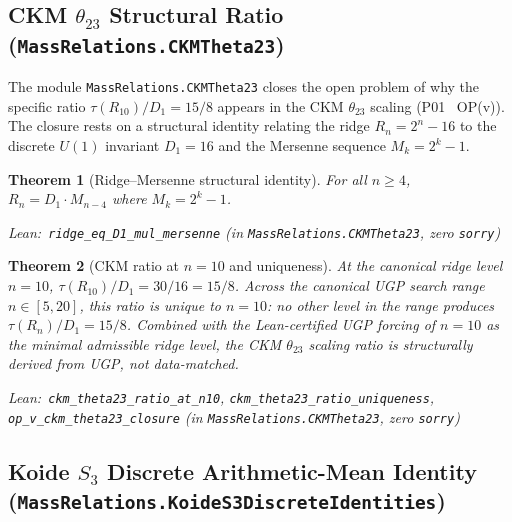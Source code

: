 \documentclass[11pt,a4paper]{article}
\newenvironment{leanref}%
  {\par\smallskip\noindent\begingroup\raggedright\textup{Lean:}~}%
  {\par\endgroup}
\newtheorem{theorem}{Theorem}[section]
\theoremstyle{definition}
\begin{document}
\subsection{CKM \texorpdfstring{$\theta_{23}$}{theta23} Structural Ratio (\texttt{MassRelations.CKMTheta23})}
\label{sec:ckm_theta23}

The module \texttt{MassRelations.CKMTheta23} closes the open problem of why the
specific ratio $\tau(R_{10})/D_1 = 15/8$ appears in the CKM $\theta_{23}$ scaling
(P01~\cite{Spivack2026_SM_UGP} OP(v)).  The closure rests on a structural identity
relating the ridge $R_n = 2^n - 16$ to the discrete $U(1)$ invariant $D_1 = 16$
and the Mersenne sequence $M_k = 2^k - 1$.

\begin{theorem}[Ridge--Mersenne structural identity]\label{thm:ridge_mersenne}
For all $n \ge 4$, $R_n = D_1 \cdot M_{n-4}$ where $M_k = 2^k - 1$.

\begin{leanref}\lstinline|ridge_eq_D1_mul_mersenne|
\textup{(in \texttt{MassRelations.CKMTheta23}, zero \texttt{sorry})}\end{leanref}
\end{theorem}

\begin{theorem}[CKM ratio at $n = 10$ and uniqueness]\label{thm:ckm_ratio_n10}
At the canonical ridge level $n = 10$, $\tau(R_{10})/D_1 = 30/16 = 15/8$.
Across the canonical UGP search range $n \in [5, 20]$, this ratio is
\emph{unique} to $n = 10$: no other level in the range produces
$\tau(R_n)/D_1 = 15/8$.  Combined with the Lean-certified UGP forcing of
$n = 10$ as the minimal admissible ridge level, the CKM $\theta_{23}$
scaling ratio is structurally derived from UGP, not data-matched.

\begin{leanref}\lstinline|ckm_theta23_ratio_at_n10|,
\lstinline|ckm_theta23_ratio_uniqueness|,
\lstinline|op_v_ckm_theta23_closure|
\textup{(in \texttt{MassRelations.CKMTheta23}, zero \texttt{sorry})}\end{leanref}
\end{theorem}

\subsection{Koide \texorpdfstring{$S_3$}{S3} Discrete Arithmetic-Mean Identity (\texttt{MassRelations.KoideS3DiscreteIdentities})}
\label{sec:koide_s3_discrete}
\end{document}
